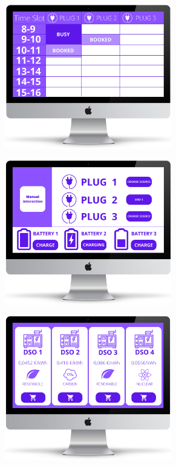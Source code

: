 \documentclass[12pt]{report}
\begin{document}
\begin{figure}[h]
\begin{subfigure}{0.49\textwidth}
        \end{subfigure}
        \begin{subfigure}{0.49\textwidth}
        \centering
        \includegraphics[width = 0.8\textwidth]{assets/cpoi4.png}
        \end{subfigure}
         \begin{subfigure}{0.49\textwidth}
        \centering
        \includegraphics[width = 0.8\textwidth]{assets/cpoi5.png}
        \end{subfigure}
        \begin{subfigure}{0.49\textwidth}
        \centering
        \includegraphics[width = 0.8\textwidth]{assets/cpoi6.png}

\end{subfigure}
\end{figure}
\end{document}

